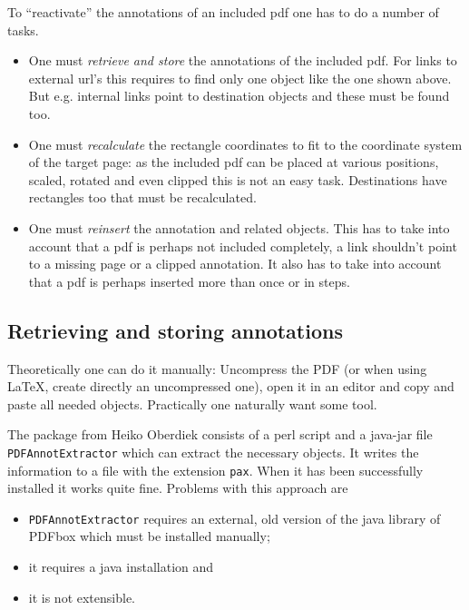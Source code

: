 \documentclass[DIV=12,parskip=half-,bibliography=totoc]{scrartcl}
\begin{document}
To \enquote{reactivate} the annotations of an included pdf one has to do a number of tasks.
\begin{itemize}
\item One must \emph{retrieve and store} the annotations of the included pdf. For links to external url's this requires to find only one object like the one shown above. But e.g. internal links point to destination objects and these must be found too.
\item One must \emph{recalculate} the rectangle coordinates to fit to the coordinate system of the target page: as the included pdf can be placed at various positions, scaled, rotated and even clipped this is not an easy task. Destinations have rectangles too that must be recalculated.
\item  One must  \emph{reinsert} the annotation and related objects. This has to take into account that a pdf is perhaps not included completely, a link shouldn't point to a missing page or a clipped annotation. It also has to take into account that a pdf is perhaps inserted more than once or in steps.
\end{itemize}

\subsection{Retrieving and storing annotations}

Theoretically one can do it manually: Uncompress the PDF (or when using \LaTeX, create directly an uncompressed one), open it in an editor and copy and paste all needed objects. Practically one naturally want some tool.

The  package from Heiko Oberdiek consists of a perl script and a java-jar file \texttt{PDFAnnotExtractor} which can extract the necessary objects. It writes the information to a file with the extension \texttt{pax}.
When it has been successfully installed it works quite fine. Problems with this approach are
\begin{itemize}
\item \texttt{PDFAnnotExtractor} requires an external, old version of the java library of PDFbox which must be installed manually;
\item it requires a java installation and
\item it is not extensible.
\end{itemize}
\end{document}
